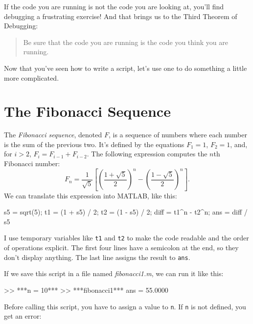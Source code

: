 

If the code you are running is not the code you are looking
at, you'll find debugging a frustrating exercise!  And that brings
us to the Third Theorem of Debugging:

\begin{quote}
Be sure that the code you are running
is the code you think you are running.
\end{quote}

Now that you've seen how to write a script, let's use one to do something a little more complicated. 

\section{The Fibonacci Sequence}


The \emph{Fibonacci sequence}, denoted $F$, is a sequence of numbers where each number is the sum of the previous two. 
It's defined by the equations $F_1 = 1$, $F_2 = 1$, and, for $i > 2$, $F_{i} = F_{i-1} + F_{i-2}$.
The following expression computes the $n$th Fibonacci number:
%
\begin{equation*}
F_n = \frac{1}{\sqrt{5}}
\left[
\left( \frac{1 + \sqrt{5}}{2} \right)^{n} -
\left( \frac{1 - \sqrt{5}}{2} \right)^{n}
\right].
\end{equation*}
%
We can translate this expression into MATLAB, like this:

\begin{code}
s5 = sqrt(5);
t1 = (1 + s5) / 2;
t2 = (1 - s5) / 2;
diff = t1^n - t2^n;
ans = diff / s5
\end{code}

I use temporary variables like \lstinline{t1} and \lstinline{t2} to make the code readable and the order of operations explicit.  The first four lines have a semicolon at the end, so they don't display anything.  The last line assigns the result to \lstinline{ans}.


If we save this script in a file named {\em fibonacci1.m}, we can run it like this:

\begin{code}
>> ***n = 10***
>> ***fibonacci1***
ans = 55.0000
\end{code}

Before calling this script, you have to assign a value to \lstinline{n}.
If \lstinline{n} is not defined, you get an error:

